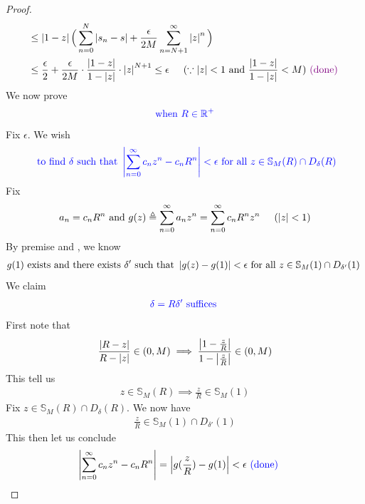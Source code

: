 \documentclass{report}
\begin{document}
\begin{proof}
\begin{align*}
 &\leq \left|1-z\right|\Big(\sum_{n=0}^N \left|s_n-s\right|+ \frac{\epsilon }{2M} \sum_{n=N+1}^\infty \left|z\right|^n \Big)\\
 &\leq  \frac{\epsilon}{2}+ \frac{\epsilon }{2M} \cdot \frac{\left|1-z\right|}{1-\left|z\right|} \cdot \left|z\right|^{N+1}\leq \epsilon \hspace{0.5cm}(\because \left|z\right|<1\text{ and }\frac{\left|1-z\right|}{1-\left|z\right|}<M)\textcolor{violet}{\text{ (done) }}
\end{align*}
We now prove 
\begin{align*}
\textcolor{blue}{\text{ when $R\in\mathbb{R}^+$ }}
\end{align*}
Fix $\epsilon $. We wish 
 \begin{align*}
   \textcolor{blue}{\text{ to find }\delta\text{ such that }\left|\sum_{n=0}^{\infty}c_nz^n-c_nR^n\right|<\epsilon \text{ for all }z \in \mathbb{S}_M(R)\cap D_\delta(R)}
\end{align*}
Fix  
\begin{align*}
a_n=c_nR^n\text{ and }g(z)\triangleq \sum_{n=0}^{\infty}a_n z^n=\sum_{n=0}^{\infty}c_nR^nz^n\hspace{0.5cm}(\left|z\right|<1)
\end{align*}
By premise and , we know 
\begin{align*}
g(1)\text{ exists and there exists $\delta'$ such that }\left|g(z)-g(1)\right|<\epsilon \text{ for all $z \in\mathbb{S}_M(1)\cap D_{\delta'}(1)$ }
\end{align*}
We claim 
\begin{align*}
  \textcolor{blue}{\delta=R\delta'\text{ suffices }}
\end{align*}
First note that 
\begin{align*}
\frac{\left|R-z\right|}{R-\left|z\right|}\in (0,M)\implies \frac{\left|1-\frac{z}{R}\right|}{1-\left|\frac{z}{R}\right|}\in (0,M)
\end{align*}
This tell us 
\begin{align*}
z\in \mathbb{S}_M(R) \implies \frac{z}{R}\in \mathbb{S}_M(1)
\end{align*}
Fix $z\in \mathbb{S}_M(R)\cap D_\delta(R)$. We now have
\begin{align*}
\frac{z}{R}\in \mathbb{S}_M(1)\cap D_{\delta'}(1)
\end{align*}
This then let us conclude
\begin{align*}
\left|\sum_{n=0}^{\infty}c_nz^n-c_nR^n\right|&=\left|g(\frac{z}{R})-g(1)\right|<\epsilon \textcolor{blue}{\text{ (done) }}
\end{align*}
\end{proof}
\end{document}
